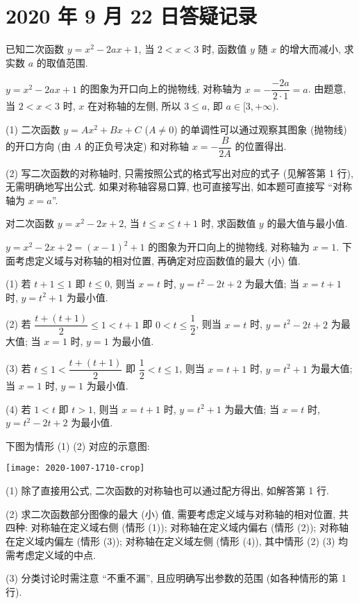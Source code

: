 \section{2020 年 9 月 22 日答疑记录}

\begin{example}
  已知二次函数 $y= x^2-2ax+1$, 当 $2<x<3$ 时, 函数值 $y$ 随 $x$ 的增大而减小, 求实数 $a$ 的取值范围.
\end{example}
\begin{solution}
  $y= x^2-2ax+1$ 的图象为开口向上的抛物线, 对称轴为 $x= -\dfrac{-2a}{2\cdot 1}= a$. 由题意, 当 $2<x<3$ 时, $x$ 在对称轴的左侧, 所以 $3\leqslant a$, 即 $a\in [3,+\infty)$.
\end{solution}
\begin{remark}
  (1) 二次函数 $y= Ax^2+Bx+C$ ($A\neq 0$) 的单调性可以通过观察其图象 (抛物线) 的开口方向 (由 $A$ 的正负号决定) 和对称轴 $x= -\dfrac{B}{2A}$ 的位置得出.
  
  (2) 写二次函数的对称轴时, 只需按照公式的格式写出对应的式子 (见解答第 1 行), 无需明确地写出公式. 如果对称轴容易口算, 也可直接写出, 如本题可直接写 ``对称轴为 $x= a$''.
\end{remark}

\begin{example}
  对二次函数 $y=x^2-2x+2$, 当 $t\leqslant x\leqslant t+1$ 时, 求函数值 $y$ 的最大值与最小值.
\end{example}
\begin{solution}
  $y=x^2-2x+2= (x-1)^2+1$ 的图象为开口向上的抛物线, 对称轴为 $x=1$. 下面考虑定义域与对称轴的相对位置, 再确定对应函数值的最大 (小) 值.
  
  (1) 若 $t+1\leqslant 1$ 即 $t\leqslant 0$, 则当 $x=t$ 时, $y=t^2-2t+2$ 为最大值; 当 $x=t+1$ 时, $y=t^2+1$ 为最小值.
  
  (2) 若 $\dfrac{t+(t+1)}2\leqslant 1< t+1$ 即 $0<t\leqslant \dfrac12$, 则当 $x=t$ 时, $y=t^2-2t+2$ 为最大值; 当 $x=1$ 时, $y=1$ 为最小值.
  
  (3) 若 $t\leqslant 1< \dfrac{t+(t+1)}2$ 即 $\dfrac12< t\leqslant 1$, 则当 $x=t+1$ 时, $y=t^2+1$ 为最大值; 当 $x=1$ 时, $y=1$ 为最小值.
  
  (4) 若 $1< t$ 即 $t> 1$, 则当 $x=t+1$ 时, $y=t^2+1$ 为最大值; 当 $x=t$ 时, $y=t^2-2t+2$ 为最小值.
  
  下图为情形 (1) (2) 对应的示意图:
  
  \begin{center}
  \texttt{[image: 2020-1007-1710-crop]}
  \end{center}
\end{solution}
\begin{remark}
  (1) 除了直接用公式, 二次函数的对称轴也可以通过配方得出, 如解答第 1 行.
  
  (2) 求二次函数部分图像的最大 (小) 值, 需要考虑定义域与对称轴的相对位置, 共四种: 对称轴在定义域右侧 (情形 (1)); 对称轴在定义域内偏右 (情形 (2)); 对称轴在定义域内偏左 (情形 (3)); 对称轴在定义域左侧 (情形 (4)), 其中情形 (2) (3) 均需考虑定义域的中点.
  
  (3) 分类讨论时需注意 ``不重不漏'', 且应明确写出参数的范围 (如各种情形的第 1 行).
\end{remark}